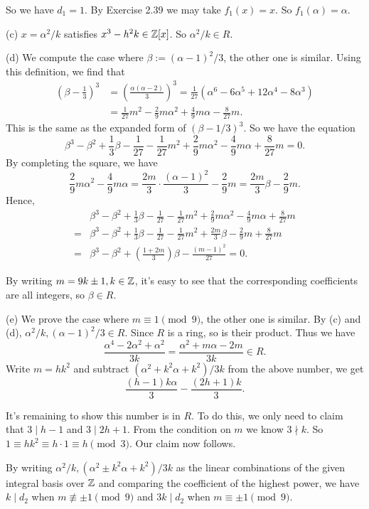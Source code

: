 \documentclass[../Marcus.tex]{subfiles}
\begin{document}
So we have $d_1=1$. By Exercise 2.39 we may take $f_1(x)=x$. So $f_1(\alpha)=\alpha$.

(c) $x=\alpha^2/k$ satisfies $x^3-h^2k\in\mathbb{Z}[x]$. So $\alpha^2/k\in R$.

(d) We compute the case where $\beta:=(\alpha-1)^2/3$, the other one is similar. Using this definition, we find that
\begin{align*}
    \left(\beta-\frac{1}{3}\right)^3 &= \left(\frac{\alpha(\alpha-2)}{3}\right)^3 = \frac{1}{27}(\alpha^6-6\alpha^5+12\alpha^4-8\alpha^3) \\
    &= \frac{1}{27}m^2-\frac{2}{9}m\alpha^2+\frac{4}{9}m\alpha-\frac{8}{27}m.
\end{align*}
This is the same as the expanded form of $(\beta-1/3)^3$. So we have the equation 
$$
\beta^3-\beta^2+\frac{1}{3}\beta-\frac{1}{27}-\frac{1}{27}m^2+\frac{2}{9}m\alpha^2-\frac{4}{9}m\alpha+\frac{8}{27}m=0.
$$
By completing the square, we have 
$$
\frac{2}{9}m\alpha^2-\frac{4}{9}m\alpha = \frac{2m}{3}\cdot\frac{(\alpha-1)^2}{3}-\frac{2}{9}m = \frac{2m}{3}\beta-\frac{2}{9}m.
$$
Hence,
\begin{align*}
    &\beta^3-\beta^2+\frac{1}{3}\beta-\frac{1}{27}-\frac{1}{27}m^2+\frac{2}{9}m\alpha^2-\frac{4}{9}m\alpha+\frac{8}{27}m \\
    ={} &\beta^3-\beta^2+\frac{1}{3}\beta-\frac{1}{27}-\frac{1}{27}m^2+\frac{2m}{3}\beta-\frac{2}{9}m+\frac{8}{27}m \\
    ={} &\beta^3-\beta^2+\left(\frac{1+2m}{3}\right)\beta-\frac{(m-1)^2}{27} = 0.
\end{align*}

By writing $m=9k\pm1,k\in\mathbb{Z}$, it's easy to see that the corresponding coefficients are all integers, so $\beta\in R$.

(e) We prove the case where $m\equiv 1\pmod{9}$, the other one is similar. By (c) and (d), $\alpha^2/k,(\alpha-1)^2/3\in R$. Since $R$ is a ring, so is their product. Thus we have 
$$
\frac{\alpha^4-2\alpha^2+\alpha^2}{3k}=\frac{\alpha^2+m\alpha-2m}{3k}\in R.
$$
Write $m=hk^2$ and subtract $(\alpha^2+k^2\alpha+k^2)/3k$ from the above number, we get 
$$
\frac{(h-1)k\alpha}{3}-\frac{(2h+1)k}{3}.
$$

It's remaining to show this number is in $R$. To do this, we only need to claim that $3\mid h-1$ and $3\mid 2h+1$. From the condition on $m$ we know $3\nmid k$. So $1\equiv hk^2\equiv h\cdot 1 \equiv h\pmod{3}$. Our claim now follows.

By writing $\alpha^2/k,(\alpha^2\pm k^2\alpha+k^2)/3k$ as the linear combinations of the given integral basis over $\mathbb{Z}$ and comparing the coefficient of the highest power, we have $k\mid d_2$ when $m\not\equiv \pm1 \pmod{9}$ and $3k\mid d_2$ when $m\equiv \pm1 \pmod{9}$.
\end{document}
